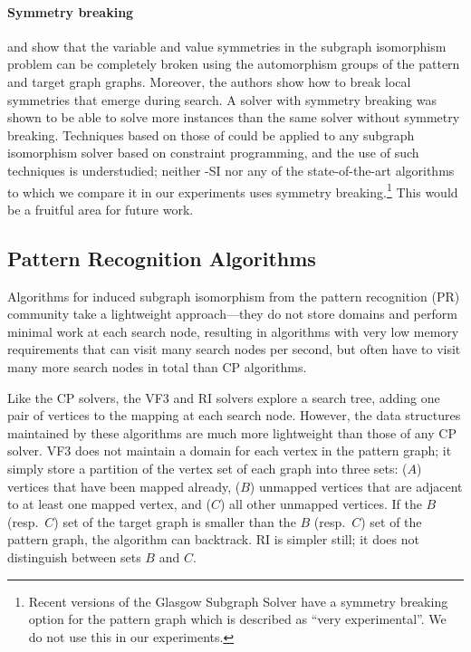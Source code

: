 \paragraph*{Symmetry breaking}
\citet{zampelli2007symmetry} and \citet{DBLP:phd/basesearch/Zampelli08}
show that the variable and value symmetries
in the subgraph isomorphism problem can be completely broken using
the automorphism groups of the pattern and target graph graphs.
Moreover, the authors show how to break local symmetries that emerge
during search.
A solver with symmetry breaking was shown to be able to solve more instances
than the same solver without symmetry breaking. 
Techniques based on those of \citeauthor{zampelli2007symmetry} 
could be applied to any subgraph isomorphism solver based on constraint programming,
and the use of such techniques is understudied; neither \McSplit-SI nor any of
the state-of-the-art algorithms to which we compare it in our experiments
uses symmetry
breaking.\footnote{Recent versions of the Glasgow Subgraph Solver
have a symmetry breaking option for the pattern graph which is described as ``very experimental''.
We do not use this in our experiments.}  This would be a fruitful area for future
work.

\subsection{Pattern Recognition Algorithms}\label{subsec:pr-sip}

Algorithms for induced subgraph isomorphism from the pattern recognition (PR) community
take a lightweight approach---they do not store domains and perform
minimal work at each search node, resulting in algorithms with very low memory
requirements that can visit many search nodes per second, but often have to
visit many more search nodes in total than CP algorithms.

Like the CP solvers, the VF3 \citep{DBLP:journals/pami/CarlettiFSV18} and RI
\citep{DBLP:journals/bmcbi/BonniciGPSF13,DBLP:journals/tcbb/BonniciG17}
solvers explore a search tree, adding one pair of vertices to the mapping at each
search node.  However, the data structures maintained by these algorithms are
much more lightweight than those of any CP solver.  VF3 does not maintain
a domain for each vertex in the pattern graph; it simply store a partition
of the vertex set of each graph into three sets: ($A$) vertices that have been
mapped already, ($B$) unmapped vertices that are adjacent to at least one mapped vertex, and
($C$) all other unmapped vertices.
If the $B$ (resp.\ $C$) set of the target graph is smaller than the $B$ (resp.\ $C$)
set of the pattern graph, the algorithm can backtrack.
RI is simpler still; it does not distinguish between sets $B$ and $C$.

